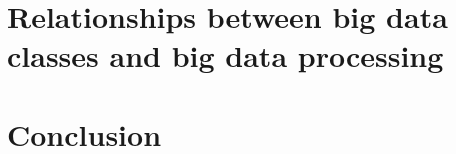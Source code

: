 \documentclass[a4paper,11pt]{article}
\begin{document}


\section{Relationships between big data classes and big data processing} %
\label{sec:relationships_between_big_data_classes_and_big_data_processing}



\section{Conclusion} %
\label{sec:conclusion}


\newpage



\end{document}
